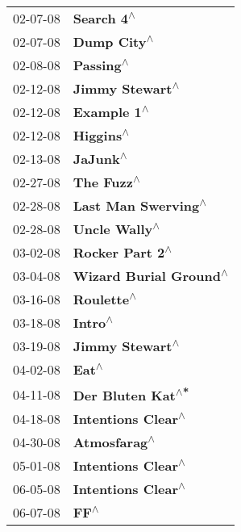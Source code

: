 \begin{supertabular}{p{0.25\columnwidth}p{0.75\columnwidth}}
 02-07-08 &                    \textbf{Search 4\textsuperscript{$\wedge$}} \\
 02-07-08 &                   \textbf{Dump City\textsuperscript{$\wedge$}} \\
 02-08-08 &                     \textbf{Passing\textsuperscript{$\wedge$}} \\
 02-12-08 &               \textbf{Jimmy Stewart\textsuperscript{$\wedge$}} \\
 02-12-08 &                   \textbf{Example 1\textsuperscript{$\wedge$}} \\
 02-12-08 &                     \textbf{Higgins\textsuperscript{$\wedge$}} \\
 02-13-08 &                      \textbf{JaJunk\textsuperscript{$\wedge$}} \\
 02-27-08 &                    \textbf{The Fuzz\textsuperscript{$\wedge$}} \\
 02-28-08 &           \textbf{Last Man Swerving\textsuperscript{$\wedge$}} \\
 02-28-08 &                 \textbf{Uncle Wally\textsuperscript{$\wedge$}} \\
 03-02-08 &               \textbf{Rocker Part 2\textsuperscript{$\wedge$}} \\
 03-04-08 &        \textbf{Wizard Burial Ground\textsuperscript{$\wedge$}} \\
 03-16-08 &                    \textbf{Roulette\textsuperscript{$\wedge$}} \\
 03-18-08 &                       \textbf{Intro\textsuperscript{$\wedge$}} \\
 03-19-08 &               \textbf{Jimmy Stewart\textsuperscript{$\wedge$}} \\
 04-02-08 &                         \textbf{Eat\textsuperscript{$\wedge$}} \\
 04-11-08 &             \textbf{Der Bluten Kat\textsuperscript{$\wedge$*}} \\
 04-18-08 &            \textbf{Intentions Clear\textsuperscript{$\wedge$}} \\
 04-30-08 &                  \textbf{Atmosfarag\textsuperscript{$\wedge$}} \\
 05-01-08 &            \textbf{Intentions Clear\textsuperscript{$\wedge$}} \\
 06-05-08 &            \textbf{Intentions Clear\textsuperscript{$\wedge$}} \\
 06-07-08 &                          \textbf{FF\textsuperscript{$\wedge$}} \\

\end{supertabular}
